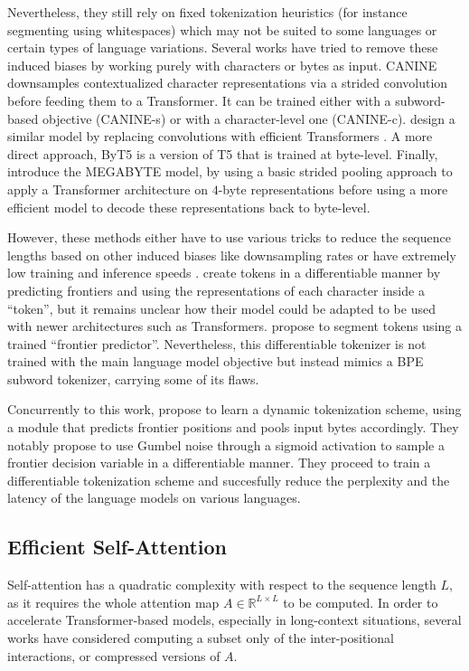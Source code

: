 Nevertheless, they still rely on fixed tokenization heuristics (for instance segmenting using whitespaces) which may not be suited to some languages or certain types of language variations. Several works have tried to remove these induced biases by working purely with characters or bytes as input. CANINE \citep{clark-etal-2022-canine} downsamples contextualized character representations via a strided convolution before feeding them to a Transformer. It can be trained either with a subword-based objective (CANINE-s) or with a character-level one (CANINE-c). \citet{tay2021charformer} design a similar model by replacing convolutions with efficient Transformers \citep{beltagy2020longformer}. A more direct approach, ByT5 \citep{xue-etal-2022-byt5} is a version of T5 that is trained at byte-level. Finally, \citet{yu2023megabyte} introduce the MEGABYTE model, by using a basic strided pooling approach to apply a Transformer architecture on $4$-byte representations before using a more efficient model to decode these representations back to byte-level.

However, these methods either have to use various tricks to reduce the sequence lengths based on other induced biases like downsampling rates or have extremely low training and inference speeds \citep{xue2022byt5}. \citet{chung2016hierarchical} create tokens in a differentiable manner by predicting frontiers and using the representations of each character inside a ``token'', but it remains unclear how their model could be adapted to be used with newer architectures such as Transformers. \citet{mofijul2022vocabulary} propose to segment tokens using a trained ``frontier predictor''. Nevertheless, this differentiable tokenizer is not trained with the main language model objective but instead mimics a BPE subword tokenizer, carrying some of its flaws.

Concurrently to this work, \citet{nawrot-etal-2023-efficient} propose to learn a dynamic tokenization scheme, using a module that predicts frontier positions and pools input bytes accordingly. They notably propose to use Gumbel noise \citep{gumbel-orig} through a sigmoid activation to sample a frontier decision variable in a differentiable manner. They proceed to train a differentiable tokenization scheme and succesfully reduce the perplexity and the latency of the language models on various languages.


\subsection{Efficient Self-Attention}
\label{ssec:efficient_attn}
Self-attention has a quadratic complexity with respect to the sequence length $L$, as it requires the whole attention map $A \in \mathbb{R}^{L \times L}$ to be computed. In order to accelerate Transformer-based models, especially in long-context situations, several works have considered computing a subset only of the inter-positional interactions, or compressed versions of $A$. 

